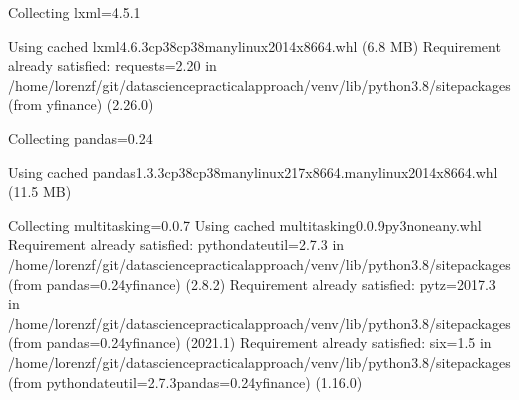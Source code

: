 \documentclass[letterpaper,10pt,english]{jupyterBook}
\begin{document}
\begin{sphinxVerbatim}[commandchars=\\\{\}]
Collecting lxml\PYGZgt{}=4.5.1
\end{sphinxVerbatim}

\begin{sphinxVerbatim}[commandchars=\\\{\}]
  Using cached lxml\PYGZhy{}4.6.3\PYGZhy{}cp38\PYGZhy{}cp38\PYGZhy{}manylinux2014\PYGZus{}x86\PYGZus{}64.whl (6.8 MB)
Requirement already satisfied: requests\PYGZgt{}=2.20 in /home/lorenzf/git/data\PYGZhy{}science\PYGZhy{}practical\PYGZhy{}approach/venv/lib/python3.8/site\PYGZhy{}packages (from yfinance) (2.26.0)
\end{sphinxVerbatim}

\begin{sphinxVerbatim}[commandchars=\\\{\}]
Collecting pandas\PYGZgt{}=0.24
\end{sphinxVerbatim}

\begin{sphinxVerbatim}[commandchars=\\\{\}]
  Using cached pandas\PYGZhy{}1.3.3\PYGZhy{}cp38\PYGZhy{}cp38\PYGZhy{}manylinux\PYGZus{}2\PYGZus{}17\PYGZus{}x86\PYGZus{}64.manylinux2014\PYGZus{}x86\PYGZus{}64.whl (11.5 MB)
\end{sphinxVerbatim}

\begin{sphinxVerbatim}[commandchars=\\\{\}]
Collecting multitasking\PYGZgt{}=0.0.7
  Using cached multitasking\PYGZhy{}0.0.9\PYGZhy{}py3\PYGZhy{}none\PYGZhy{}any.whl
Requirement already satisfied: python\PYGZhy{}dateutil\PYGZgt{}=2.7.3 in /home/lorenzf/git/data\PYGZhy{}science\PYGZhy{}practical\PYGZhy{}approach/venv/lib/python3.8/site\PYGZhy{}packages (from pandas\PYGZgt{}=0.24\PYGZhy{}\PYGZgt{}yfinance) (2.8.2)
Requirement already satisfied: pytz\PYGZgt{}=2017.3 in /home/lorenzf/git/data\PYGZhy{}science\PYGZhy{}practical\PYGZhy{}approach/venv/lib/python3.8/site\PYGZhy{}packages (from pandas\PYGZgt{}=0.24\PYGZhy{}\PYGZgt{}yfinance) (2021.1)
Requirement already satisfied: six\PYGZgt{}=1.5 in /home/lorenzf/git/data\PYGZhy{}science\PYGZhy{}practical\PYGZhy{}approach/venv/lib/python3.8/site\PYGZhy{}packages (from python\PYGZhy{}dateutil\PYGZgt{}=2.7.3\PYGZhy{}\PYGZgt{}pandas\PYGZgt{}=0.24\PYGZhy{}\PYGZgt{}yfinance) (1.16.0)
\end{sphinxVerbatim}
\end{document}
